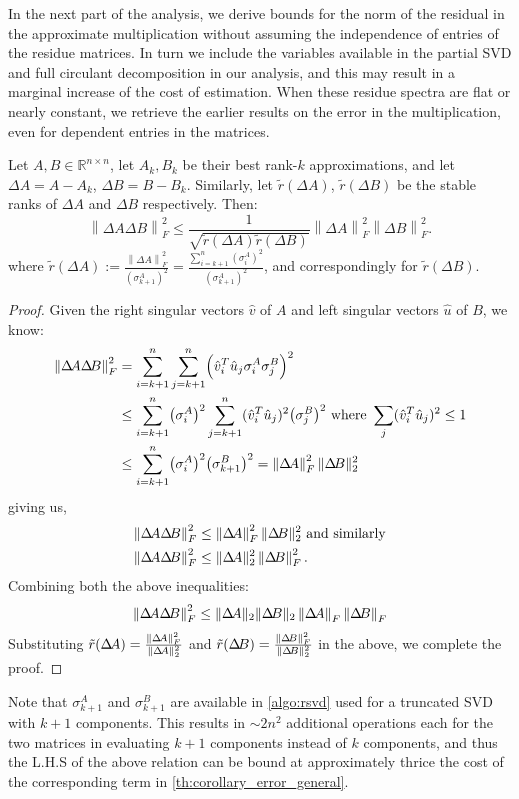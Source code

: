 \documentclass[onefignum,onetabnum]{siamart171218}
\newcommand{\R}{\mathbb{R}}
\newcommand{\normF}[1]{\left\|#1\right\|_F}
\newcommand{\DA}{\Delta\!A}
\newcommand{\DB}{\Delta\!B}
\newcommand{\rtilde}{\tilde{r}}
\DeclarePairedDelimiter\norm{\lVert}{\rVert}
\begin{document}
In the next part of the analysis, we derive bounds for the norm of the residual in the approximate multiplication without assuming the independence of entries of the residue matrices. In turn we include the variables available in the partial SVD and full circulant decomposition in our analysis, and this may result in a marginal increase of the cost of  estimation. When these residue spectra are flat or nearly constant, we retrieve the earlier results on the error in the multiplication, even for dependent entries in the matrices.

\begin{theorem}
Let $A, B \in \R^{n \times n}$, let $A_k, B_k$ be their best rank-$k$ approximations, and let $\DA = A - A_k$, $\DB = B - B_k$. Similarly, let $\rtilde(\DA)$, $\rtilde(\DB)$ be the stable ranks of $\DA$ and $\DB$ respectively. Then: $$\normF{\DA \DB}^2 \leq \frac{1}{\sqrt{\rtilde(\DA)\rtilde(\DB)}}\normF{\DA}^2 \normF{\DB}^2.$$
where $\rtilde(\DA):= \frac{\normF{\DA}^2}{(\sigma_{k+1}^A)^2} = \frac{\sum_{i=k+1}^n (\sigma_i^A)^2}{(\sigma_{k+1}^A)^2}$, and correspondingly for $\rtilde(\DB)$.
\end{theorem}

\begin{proof}
Given the right singular vectors $\hat{v}$ of $A$ and left singular vectors $\hat{u}$ of $B$, we know:
\begin{align*}
   \normF{\DA \DB}^2 &= \sum_{i=k+1}^n \sum_{j=k+1}^n \Bigl(\hat{v}_i^T\hat{u}_j\sigma_i^A \sigma_j^B\Bigr)^2\\
   & \leq \sum_{i=k+1}^n \bigl(\sigma_i^A\bigr)^2  \sum_{j=k+1}^n (\hat{v}_i^T\hat{u}_j)^2 \bigl(\sigma_j^B\bigr)^2 \text{ where } \sum_j (\hat{v}_i^T\hat{u}_j)^2\leq 1\\
   & \leq \sum_{i=k+1}^n \bigl(\sigma_i^A\bigr)^2 \bigl(\sigma_{k+1}^B\bigr)^2 = \normF{\DA}^2 \norm{\DB}_2^2
\end{align*}
giving us,
\begin{align}
\normF{\DA \DB}^2 & \leq \normF{\DA}^2 \norm{\DB}_2^2 \text{ and similarly}\\
 \normF{\DA \DB}^2 & \leq \norm{\DA}_2^2 \normF{\DB}^2.
\end{align}
Combining both the above inequalities:
\begin{equation*}
   \normF{\DA \DB}^2 \leq \norm{\DA}_2 \norm{\DB}_2\normF{\DA} \normF{\DB} 
\end{equation*}
Substituting $\rtilde(\DA)= \frac{\normF{\DA}^2}{\norm{\DA}_2^2}$ and $\rtilde(\DB)= \frac{\normF{\DB}^2}{\norm{\DB}_2^2}$ in the above, we complete the proof.
 
\end{proof}
Note that $\sigma_{k+1}^A$ and $\sigma_{k+1}^B$ are available in \cref{algo:rsvd} used for a truncated SVD with $k+1$ components. This results in $\sim 2n^2$ additional operations each for the two matrices in evaluating $k+1$ components instead of $k$ components, and thus the L.H.S of the above relation can be bound at approximately thrice the cost of the corresponding term in \cref{th:corollary_error_general}.
\end{document}
